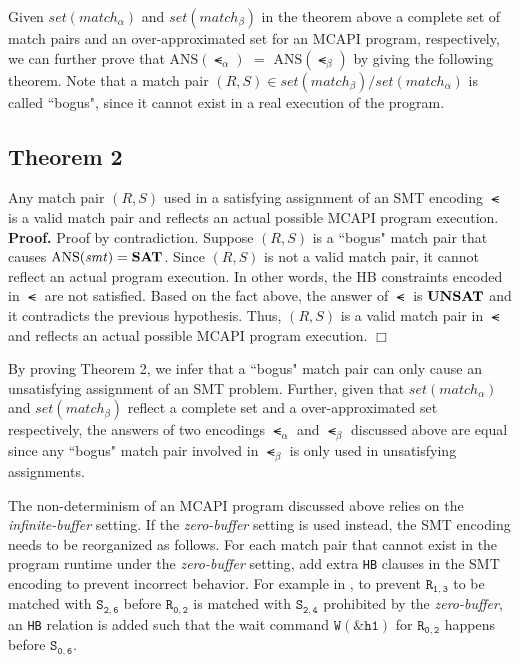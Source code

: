 Given $\mathit{set(match_{\alpha})}$ and $\mathit{set(match_{\beta})}$ in the theorem above a complete set of match pairs and an over-approximated set for an MCAPI program, respectively, we can further prove that $\mathrm{ANS}(\smt_{\alpha})$ $ = $ $\mathrm{ANS}(\smt_{\beta})$ by giving the following theorem. Note that a match pair $(R, S) \in \mathit{set(match_{\beta})}/\mathit{set(match_{\alpha})}$ is called ``bogus", since it cannot exist in a real execution of the program.

\subsection{Theorem 2}
Any match pair $(R, S)$ used in a satisfying assignment of an SMT encoding $\smt$ is a valid match pair and reflects an actual possible MCAPI program execution.
\\
\textbf{Proof.}
Proof by contradiction. Suppose $(R, S)$ is a ``bogus" match pair that causes $\mathrm{ANS}(\mathit{smt}) = \textbf{SAT}$. Since $(R, S)$ is not a valid match pair, it cannot reflect an actual program execution. In other words, the $\mathrm{HB}$ constraints encoded in $\smt$ are not satisfied. Based on the fact above, the answer of $\smt$ is $\textbf{UNSAT}$ and it contradicts the previous hypothesis. Thus, $(R, S)$ is a valid match pair in $\smt$ and reflects an actual possible MCAPI program execution. $\Box$

By proving Theorem 2, we infer that a ``bogus" match pair can only cause an unsatisfying assignment of an SMT problem. Further, given that $\mathit{set(match_{\alpha})}$ and $\mathit{set(match_{\beta})}$ reflect a complete set and a over-approximated set respectively, the answers of two encodings $\smt_{\alpha}$ and $\smt_{\beta}$ discussed above are equal since any ``bogus" match pair involved in $\smt_{\beta}$ is only used in unsatisfying assignments.

The non-determinism of an MCAPI program discussed above relies on the \textit{infinite-buffer} setting. If the \textit{zero-buffer} setting is used instead, the SMT encoding needs to be reorganized as follows. For each match pair that cannot exist in the program runtime under the \textit{zero-buffer} setting, add extra \texttt{HB} clauses in the SMT encoding to prevent incorrect behavior. For example in , to prevent $\mathtt{R_{1,3}}$ to be matched with $\mathtt{S_{2,6}}$ before $\mathtt{R_{0,2}}$ is matched with $\mathtt{S_{2,4}}$ prohibited by the \textit{zero-buffer}, an \texttt{HB} relation is added such that the wait command $\mathtt{W(\&h1)}$ for $\mathtt{R_{0,2}}$ happens before $\mathtt{S_{0,6}}$.













